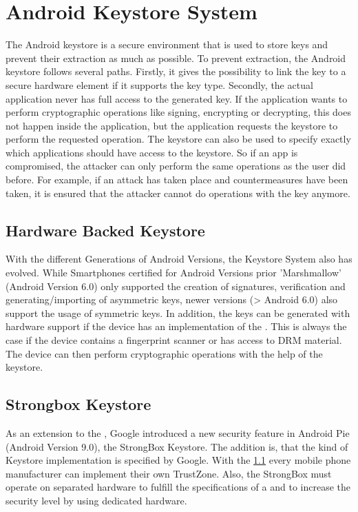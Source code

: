 \documentclass[12pt,oneside,a4paper,parskip]{scrbook}
\begin{document}
\section{Android Keystore System}

The Android keystore is a secure environment that is used to store keys and prevent their extraction as much as possible. To prevent extraction, the Android keystore follows several paths. Firstly, it gives the possibility to link the key to a secure hardware element if it supports the key type. Secondly, the actual application never has full access to the generated key. If the application wants to perform cryptographic operations like signing, encrypting or decrypting, this does not happen inside the application, but the application requests the keystore to perform the requested operation. The keystore can also be used to specify exactly which applications should have access to the keystore. So if an app is compromised, the attacker can only perform the same operations as the user did before. For example, if an attack has taken place and countermeasures have been taken, it is ensured that the attacker cannot do operations with the key anymore. 
\parencite{google_android_2020}

\subsection{Hardware Backed Keystore}
\label{android:HWB}

With the different Generations of Android Versions, the Keystore System also has evolved. While Smartphones certified for Android Versions prior 'Marshmallow' (Android Version 6.0) only supported the creation of signatures, verification and generating/importing of asymmetric keys, newer versions (> Android 6.0) also support the usage of symmetric keys. In addition, the keys can be generated with hardware support if the device has an implementation of the . This is always the case if the device contains a fingerprint scanner or has access to DRM material. The device can then perform cryptographic operations with the help of the keystore.
\parencite{google_hardware-backed_2020}


\subsection{Strongbox Keystore}

As an extension to the , Google introduced a new security feature in Android Pie (Android Version 9.0), the StrongBox Keystore. The addition is, that the kind of Keystore implementation is specified by Google. With the \ref{android:HWB} every mobile phone manufacturer can implement their own TrustZone. Also, the StrongBox must operate on separated hardware to fulfill the specifications of a  and to increase the security level by using dedicated hardware.
\end{document}
